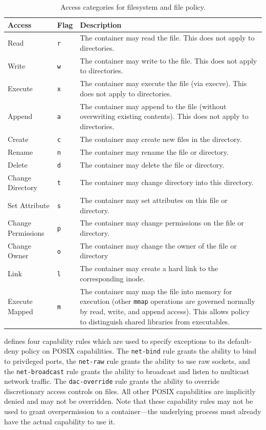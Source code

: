 {
\small
\begin{longtable}[c]{llp{25em}}
  \caption{
    Access categories for filesystem and file policy.
  }
  \label{tab:fs_policy}\\
  \toprule
  Access             & Flag       & Description \\
  \midrule
  \endfirsthead
  Read               & \texttt{r} & The container may read the file. This does not apply to directories. \\
  Write              & \texttt{w} & The container may write to the file. This does not apply to directories. \\
  Execute            & \texttt{x} & The container may execute the file (via execve). This does not apply to directories. \\
  Append             & \texttt{a} & The container may append to the file (without overwriting existing contents). This does not apply to directories.\\
  Create             & \texttt{c} & The container may create new files in the directory. \\
  Rename             & \texttt{n} & The container may rename the file or directory. \\
  Delete             & \texttt{d} & The container may delete the file or directory. \\
  Change Directory   & \texttt{t} & The container may change directory into this directory. \\
  Set Attribute      & \texttt{s} & The container may set attributes on this file or directory. \\
  Change Permissions & \texttt{p} & The container may change permissions on the file or directory. \\
  Change Owner       & \texttt{o} & The container may change the owner of the file or directory \\
  Link               & \texttt{l} & The container may create a hard link to the corresponding inode. \\
  Execute Mapped     & \texttt{m} & The container may map the file into memory for execution (other \texttt{mmap} operations are governed normally by read, write, and append access). This allows policy to distinguish shared libraries from executables. \\
  \bottomrule
\end{longtable}
}

\bpfcontain{} defines four capability rules which are used to specify exceptions to its default-deny policy on POSIX capabilities. The \texttt{net-bind} rule grants the ability to bind to privileged ports, the \texttt{net-raw} rule grants the ability to use raw sockets, and the \texttt{net-broadcast} rule grants the ability to broadcast and listen to multicast network traffic. The \texttt{dac-override} rule grants the ability to override discretionary access controls on files. All other POSIX capabilities are implicitly denied and may not be overridden. Note that these capability rules may not be used to grant overpermission to a container---the underlying process must already have the actual capability to use it.


